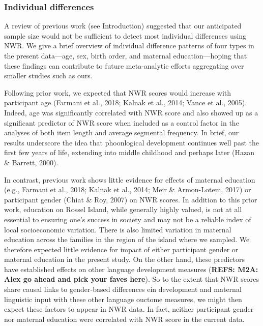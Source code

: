\documentclass[english,,man,floatsintext]{apa6}
\begin{document}
\hypertarget{individual-differences}{%
\subsubsection{Individual differences}\label{individual-differences}}

A review of previous work (see Introduction) suggested that our anticipated sample size would not be sufficient to detect most individual differences using NWR. We give a brief overview of individual difference patterns of four types in the present data---age, sex, birth order, and maternal education---hoping that these findings can contribute to future meta-analytic efforts aggregating over smaller studies such as ours.

Following prior work, we expected that NWR scores would increase with participant age (Farmani et al., 2018; Kalnak et al., 2014; Vance et al., 2005). Indeed, age was significantly correlated with NWR score and also showed up as a significant predictor of NWR score when included as a control factor in the analyses of both item length and average segmental frequency. In brief, our results underscore the idea that phoonlogical development continues well past the first few years of life, extending into middle childhood and perhaps later (Hazan \& Barrett, 2000).

In contrast, previous work shows little evidence for effects of maternal education (e.g., Farmani et al., 2018; Kalnak et al., 2014; Meir \& Armon-Lotem, 2017) or participant gender (Chiat \& Roy, 2007) on NWR scores. In addition to this prior work, education on Rossel Island, while generally highly valued, is not at all essential to ensuring one's success in society and may not be a reliable index of local socioeconomic variation. There is also limited variation in maternal education across the families in the region of the island where we sampled. We therefore expected little evidence for impact of either participant gender or maternal education in the present study. On the other hand, these predictors have established effects on other language development measures (\textbf{REFS: M2A: Alex go ahead and pick your faves here}). So to the extent that NWR scores share causal links to gender-based differences ein development and maternal linguistic input with these other language ouctome measures, we might then expect these factors to appear in NWR data. In fact, neither participant gender nor maternal education were correlated with NWR score in the current data.
\end{document}
